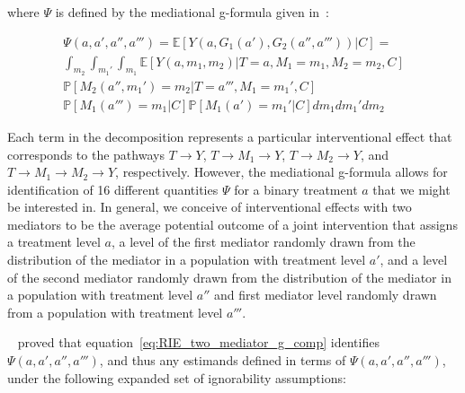 where $\Psi$ is defined by the mediational g-formula given in~\cite{linvanderweele2017}:

\begin{equation}\label{eq:RIE_two_mediator_g_comp}
\begin{aligned}
	\Psi(a,a',a'',a''') = \mathbb{E}[Y(a,G_{1}(a'),G_{2}(a'',a'''))|C] =\\ 
	\int_{m_{2}}\int_{m_{1}'}\int_{m_{1}} \mathbb{E}[Y(a,m_{1},m_{2})|T = a, 
	M_{1} = m_{1}, M_{2} = m_{2}, C]\\
	\mathbb{P}[M_{2}(a'',m_{1}') = m_{2}|T = a''', M_{1} = m_{1}', C]\\
	\mathbb{P}[M_{1}(a''') = m_{1}|C]\mathbb{P}[M_{1}(a') = m_{1}'|C]dm_{1}dm_{1}'dm_{2}
\end{aligned}
\end{equation}

Each term in the decomposition represents a particular interventional effect that corresponds 
to the pathways 
$T \rightarrow Y$, $T \rightarrow M_{1} \rightarrow Y$, $T \rightarrow M_{2} \rightarrow Y$, 
and $T \rightarrow M_{1} \rightarrow M_{2} \rightarrow Y$, respectively. However, the mediational
g-formula allows for identification of 16 different quantities $\Psi$ for a binary treatment $a$ 
that we might be interested in. In general, we conceive of interventional 
effects with two mediators to be the average potential outcome of a joint intervention that assigns
a treatment level $a$, a level of the first mediator randomly drawn from the distribution of the
mediator in a population with treatment level $a'$, and a level of the second mediator randomly drawn
from the distribution of the mediator in a population with treatment level $a''$ and first mediator 
level randomly drawn from a population with treatment level $a'''$. 

~\cite{linvanderweele2017} proved that equation~\ref{eq:RIE_two_mediator_g_comp} identifies 
$\Psi(a,a',a'',a''')$, and thus any estimands defined in terms of $\Psi(a,a',a'',a''')$, 
under the following expanded set of ignorability assumptions: 

